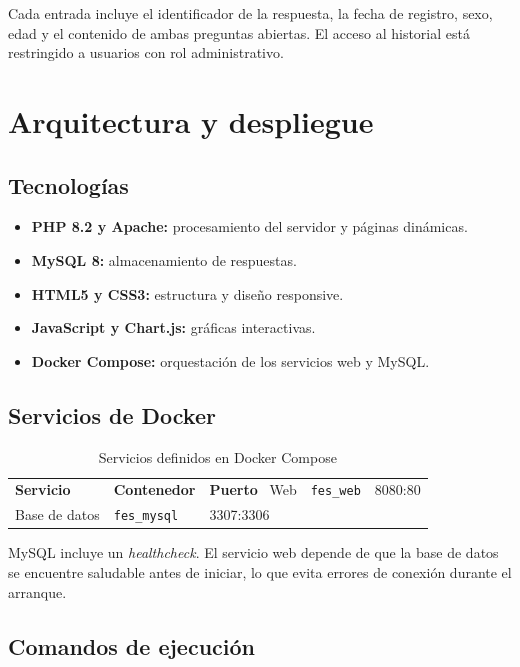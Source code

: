 \documentclass[12pt,letterpaper,oneside]{extreport}
\begin{document}
Cada entrada incluye el identificador de la respuesta, la fecha de registro, sexo, edad y el contenido de ambas preguntas abiertas. El acceso al historial está restringido a usuarios con rol administrativo.


\chapter{Arquitectura y despliegue}

\section{Tecnologías}

\begin{itemize}
    \item \textbf{PHP 8.2 y Apache:} procesamiento del servidor y páginas dinámicas.
    \item \textbf{MySQL 8:} almacenamiento de respuestas.
    \item \textbf{HTML5 y CSS3:} estructura y diseño responsive.
    \item \textbf{JavaScript y Chart.js:} gráficas interactivas.
    \item \textbf{Docker Compose:} orquestación de los servicios web y MySQL.
\end{itemize}

\section{Servicios de Docker}

\begin{table}[H]
\centering
\caption{Servicios definidos en Docker Compose}
\begin{tabular}{lll}
\toprule
\textbf{Servicio} & \textbf{Contenedor} & \textbf{Puerto}\
\midrule
Web & \texttt{fes\_web} & 8080:80\\
Base de datos & \texttt{fes\_mysql} & 3307:3306\\
\bottomrule
\end{tabular}
\end{table}

MySQL incluye un \textit{healthcheck}. El servicio web depende de que la base de datos se encuentre saludable antes de iniciar, lo que evita errores de conexión durante el arranque.

\section{Comandos de ejecución}
\end{document}
